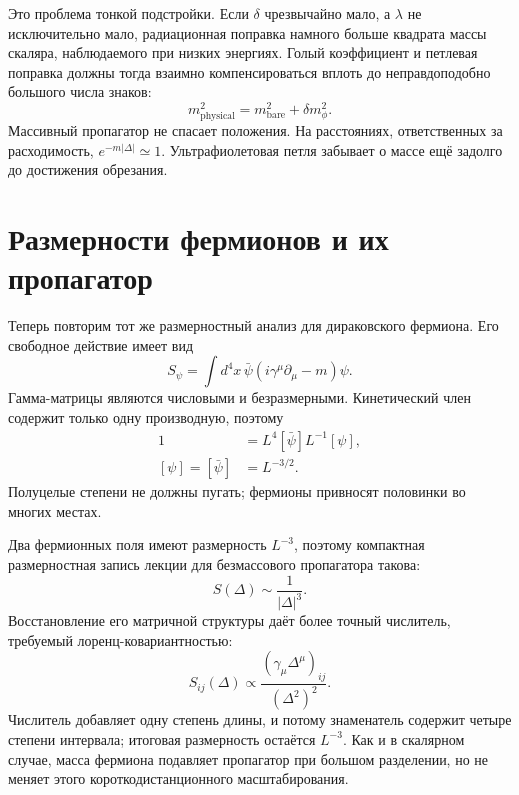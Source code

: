 Это проблема тонкой подстройки. Если \(\delta\) чрезвычайно мало, а \(\lambda\) не исключительно мало, радиационная поправка намного больше квадрата массы скаляра, наблюдаемого при низких энергиях. Голый коэффициент и петлевая поправка должны тогда взаимно компенсироваться вплоть до неправдоподобно большого числа знаков:
\begin{equation}
m_{\mathrm{physical}}^2
=m_{\mathrm{bare}}^2+\delta m_\phi^2.
\end{equation}
Массивный пропагатор не спасает положения. На расстояниях, ответственных за расходимость, \(e^{-m|\Delta|}\simeq1\). Ультрафиолетовая петля забывает о массе ещё задолго до достижения обрезания.

\section{Размерности фермионов и их пропагатор}

Теперь повторим тот же размерностный анализ для дираковского фермиона. Его свободное действие имеет вид
\begin{equation}
S_\psi=\int d^4x\,
\bar\psi\left(i\gamma^\mu\partial_\mu-m\right)\psi.
\end{equation}
Гамма-матрицы являются числовыми и безразмерными. Кинетический член содержит только одну производную, поэтому
\begin{align}
1
&=L^4[\bar\psi]L^{-1}[\psi],\\
[\psi]=[\bar\psi]&=L^{-3/2}.
\end{align}
Полуцелые степени не должны пугать; фермионы привносят половинки во многих местах.

\begin{classroomqa}
\end{classroomqa}

Два фермионных поля имеют размерность \(L^{-3}\), поэтому компактная размерностная запись лекции для безмассового пропагатора такова:
\begin{equation}
S(\Delta)\sim\frac{1}{|\Delta|^3}.
\end{equation}
Восстановление его матричной структуры даёт более точный числитель, требуемый лоренц-ковариантностью:
\begin{equation}
S_{ij}(\Delta)
\propto
\frac{\left(\gamma_\mu\Delta^\mu\right)_{ij}}
{\left(\Delta^2\right)^2}.
\end{equation}
Числитель добавляет одну степень длины, и потому знаменатель содержит четыре степени интервала; итоговая размерность остаётся \(L^{-3}\). Как и в скалярном случае, масса фермиона подавляет пропагатор при большом разделении, но не меняет этого короткодистанционного масштабирования.

